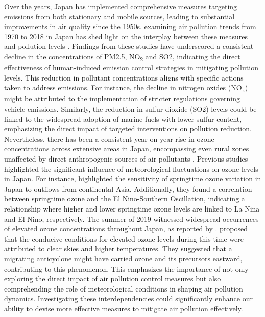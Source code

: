 Over the years, Japan has implemented comprehensive measures targeting emissions from both stationary and mobile sources, leading to substantial improvements in air quality since the 1950s. examining air pollution trends from 1970 to 2018 in Japan has shed light on the interplay between these measures and pollution levels \citep{ito202130, kannari2013thirty, wakamatsu2013air}. Findings from these studies have underscored a consistent decline in the concentrations of PM2.5, NO\textsubscript{2} and SO2, indicating the direct effectiveness of human-induced emission control strategies in mitigating pollution levels. This reduction in pollutant concentrations aligns with specific actions taken to address emissions. For instance, the decline in nitrogen oxides (NO\textsubscript{x}) might be attributed to the implementation of stricter regulations governing vehicle emissions. Similarly, the reduction in sulfur dioxide (SO2) levels could be linked to the widespread adoption of marine fuels with lower sulfur content, emphasizing the direct impact of targeted interventions on pollution reduction. Nevertheless, there has been a consistent year-on-year rise in ozone concentrations across extensive areas in Japan, encompassing even rural zones unaffected by direct anthropogenic sources of air pollutants \citep{ito202130}. Previous studies highlighted the significant influence of meteorological fluctuations on ozone levels in Japan. For instance, \citep{kurokawa2009influence} highlighted the sensitivity of springtime ozone variation in Japan to outflows from continental Asia. Additionally, they found a correlation between springtime ozone and the El Nino-Southern Oscillation, indicating a relationship where higher and lower springtime ozone levels are linked to La Nina and El Nino, respectively. The summer of 2019 witnessed widespread occurrences of elevated ozone concentrations throughout Japan, as reported by \citep{fukunaga2021relationship, ito202130}.\citep{fukunaga2021relationship} proposed that the conducive conditions for elevated ozone levels during this time were attributed to clear skies and higher temperatures. They suggested that a migrating anticyclone might have carried ozone and its precursors eastward, contributing to this phenomenon. This emphasizes the importance of not only exploring the direct impact of air pollution control measures but also comprehending the role of meteorological conditions in shaping air pollution dynamics. Investigating these interdependencies could significantly enhance our ability to devise more effective measures to mitigate air pollution effectively. \par

